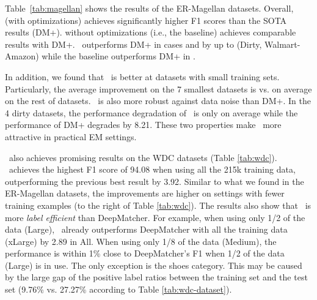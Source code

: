 Table~\ref{tab:magellan} shows the results of the ER-Magellan datasets. Overall, \system{} (with optimizations) achieves significantly higher F1 scores than the SOTA results (DM+). \system{} without optimizations (i.e., the baseline) achieves comparable results with DM+.
\system\ outperforms DM+ in   cases and by up to  (Dirty, Walmart-Amazon) while the baseline outperforms DM+ in .


In addition, we found that \system\ is better at datasets with small training sets.
Particularly, the average improvement on the 7 smallest datasets is  vs.  on average on the rest of datasets. 
\system\ is also more robust against data noise than DM+. In the 4 dirty datasets,
the performance degradation of \system\ is only  on average
while the performance of DM+ degrades by 8.21.
These two properties make \system\ more attractive in practical EM settings.


\system\ also achieves promising results on the WDC datasets (Table \ref{tab:wdc}).
\system\ achieves the highest F1 score of 94.08 when using all the 215k training data, outperforming
the previous best result by 3.92. Similar to what we found in the ER-Magellan datasets,
the improvements are higher on settings with fewer training examples (to the right of Table \ref{tab:wdc}).
The results also show that \system\ is more \emph{label efficient} than DeepMatcher.
For example, when using only 1/2 of the data (Large), \system\ already outperforms DeepMatcher with all the training data (xLarge) by 2.89 in All. When using only 1/8 of the data (Medium), the performance is within 1\% close to DeepMatcher's F1 when 1/2 of the data (Large) is in use.
The only exception is the shoes category. This may be caused by the large gap of the positive label ratios 
between the training set and the test set (9.76\% vs. 27.27\% according to Table \ref{tab:wdc-dataset}).


